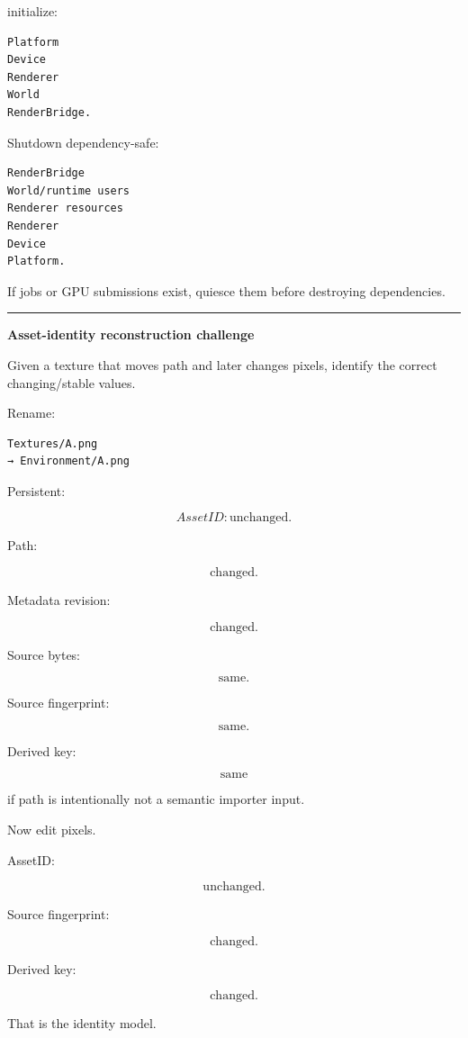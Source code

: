 initialize:

\begin{verbatim}
Platform
Device
Renderer
World
RenderBridge.
\end{verbatim}

Shutdown dependency-safe:

\begin{verbatim}
RenderBridge
World/runtime users
Renderer resources
Renderer
Device
Platform.
\end{verbatim}

If jobs or GPU submissions exist, quiesce them before destroying dependencies.

\begin{center}\rule{0.5\linewidth}{0.5pt}\end{center}

\textbf{Asset-identity reconstruction challenge}

Given a texture that moves path and later changes pixels, identify the correct changing/stable values.

Rename:

\begin{verbatim}
Textures/A.png
→ Environment/A.png
\end{verbatim}

Persistent:

\[
AssetID:
\text{unchanged}.
\]

Path:

\[
\text{changed}.
\]

Metadata revision:

\[
\text{changed}.
\]

Source bytes:

\[
\text{same}.
\]

Source fingerprint:

\[
\text{same}.
\]

Derived key:

\[
\text{same}
\]

if path is intentionally not a semantic importer input.

Now edit pixels.

AssetID:

\[
\text{unchanged}.
\]

Source fingerprint:

\[
\text{changed}.
\]

Derived key:

\[
\text{changed}.
\]

That is the identity model.

